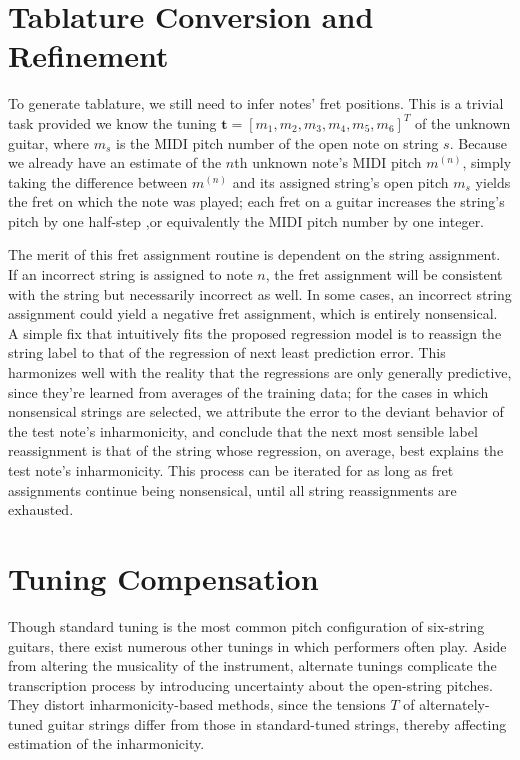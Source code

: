 \documentclass[12pt]{cmuthesis}
\begin{document}
\section{Tablature Conversion and Refinement}
To generate tablature, we still need to infer notes' fret positions. This is a trivial task provided we know the tuning $\mathbf{t} = [m_1, m_2, m_3, m_4, m_5, m_6]^T$ of the unknown guitar, where $m_s$ is the MIDI pitch number of the open note on string $s$. Because we already have an estimate of the $n$th unknown note's MIDI pitch $m^{(n)}$, simply taking the difference between $m^{(n)}$ and its assigned string's open pitch $m_s$ yields the fret on which the note was played; each fret on a guitar increases the string's pitch by one half-step ,or equivalently the MIDI pitch number by one integer.

The merit of this fret assignment routine is dependent on the string assignment. If an incorrect string is assigned to note $n$, the fret assignment will be consistent with the string but necessarily incorrect as well. In some cases, an incorrect string assignment could yield a negative fret assignment, which is entirely nonsensical. A simple fix that intuitively fits the proposed regression model is to reassign the string label to that of the regression of next least prediction error. This harmonizes well with the reality that the regressions are only generally predictive, since they're learned from averages of the training data; for the cases in which nonsensical strings are selected, we attribute the error to the deviant behavior of the test note's inharmonicity, and conclude that the next most sensible label reassignment is that of the string whose regression, on average, best explains the test note's inharmonicity. This process can be iterated for as long as fret assignments continue being nonsensical, until all string reassignments are exhausted.

\section{Tuning Compensation}
Though standard tuning is the most common pitch configuration of six-string guitars, there exist numerous other tunings in which performers often play. Aside from altering the musicality of the instrument, alternate tunings complicate the transcription process by introducing uncertainty about the open-string pitches. They distort inharmonicity-based methods, since the tensions $T$ of alternately-tuned guitar strings differ from those in standard-tuned strings, thereby affecting estimation of the inharmonicity. 
\end{document}
